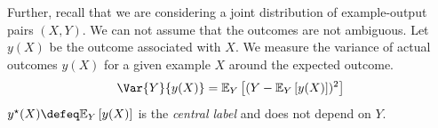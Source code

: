 \documentclass[
	twoside=false, %
]{kaobook}
\begin{document}
Further, recall that we are considering a joint distribution of example-output pairs $(X,Y)$. We can not assume that the outcomes are not ambiguous. Let $y(X)$ be the outcome associated with $X$.
We measure the variance of actual outcomes $y(X)$ for a given example $X$ around the expected outcome.
$$
\Var{Y}{y(X)} = \mathbb{E}_{Y}\left[ (Y-\mathbb{E}_{Y}\left[ y(X) \right] )^2 \right] 
$$
$y^\star(X) \defeq \mathbb{E}_{Y}\left[ y(X) \right]$ is the \textit{central label} and does not depend on $Y$.


\end{document}
